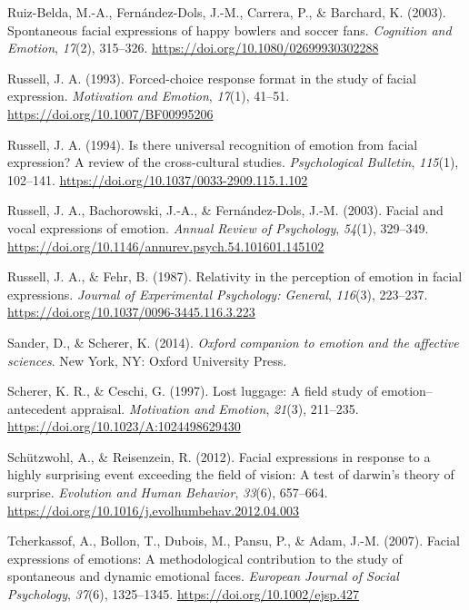 \documentclass[
  english,
  doc]{apa7}
\newlength{\cslhangindent}
\newenvironment{cslreferences}%
  {\setlength{\parindent}{0pt}%
  \everypar{\setlength{\hangindent}{\cslhangindent}}\ignorespaces}%
  {\par}
\begin{document}
\begin{cslreferences}
\leavevmode\hypertarget{ref-ruiz2003spontaneous}{}%
Ruiz-Belda, M.-A., Fernández-Dols, J.-M., Carrera, P., \& Barchard, K. (2003). Spontaneous facial expressions of happy bowlers and soccer fans. \emph{Cognition and Emotion}, \emph{17}(2), 315--326. \url{https://doi.org/10.1080/02699930302288}

\leavevmode\hypertarget{ref-russell1993forced}{}%
Russell, J. A. (1993). Forced-choice response format in the study of facial expression. \emph{Motivation and Emotion}, \emph{17}(1), 41--51. \url{https://doi.org/10.1007/BF00995206}

\leavevmode\hypertarget{ref-russell1994there}{}%
Russell, J. A. (1994). Is there universal recognition of emotion from facial expression? A review of the cross-cultural studies. \emph{Psychological Bulletin}, \emph{115}(1), 102--141. \url{https://doi.org/10.1037/0033-2909.115.1.102}

\leavevmode\hypertarget{ref-russell2003facial}{}%
Russell, J. A., Bachorowski, J.-A., \& Fernández-Dols, J.-M. (2003). Facial and vocal expressions of emotion. \emph{Annual Review of Psychology}, \emph{54}(1), 329--349. \url{https://doi.org/10.1146/annurev.psych.54.101601.145102}

\leavevmode\hypertarget{ref-russell1987relativity}{}%
Russell, J. A., \& Fehr, B. (1987). Relativity in the perception of emotion in facial expressions. \emph{Journal of Experimental Psychology: General}, \emph{116}(3), 223--237. \url{https://doi.org/10.1037/0096-3445.116.3.223}

\leavevmode\hypertarget{ref-sander2014oxford}{}%
Sander, D., \& Scherer, K. (2014). \emph{Oxford companion to emotion and the affective sciences}. New York, NY: Oxford University Press.

\leavevmode\hypertarget{ref-scherer1997lost}{}%
Scherer, K. R., \& Ceschi, G. (1997). Lost luggage: A field study of emotion--antecedent appraisal. \emph{Motivation and Emotion}, \emph{21}(3), 211--235. \url{https://doi.org/10.1023/A:1024498629430}

\leavevmode\hypertarget{ref-schutzwohl2012facial}{}%
Schützwohl, A., \& Reisenzein, R. (2012). Facial expressions in response to a highly surprising event exceeding the field of vision: A test of darwin's theory of surprise. \emph{Evolution and Human Behavior}, \emph{33}(6), 657--664. \url{https://doi.org/10.1016/j.evolhumbehav.2012.04.003}

\leavevmode\hypertarget{ref-tcherkassof2007facial}{}%
Tcherkassof, A., Bollon, T., Dubois, M., Pansu, P., \& Adam, J.-M. (2007). Facial expressions of emotions: A methodological contribution to the study of spontaneous and dynamic emotional faces. \emph{European Journal of Social Psychology}, \emph{37}(6), 1325--1345. \url{https://doi.org/10.1002/ejsp.427}


\end{cslreferences}
\end{document}
